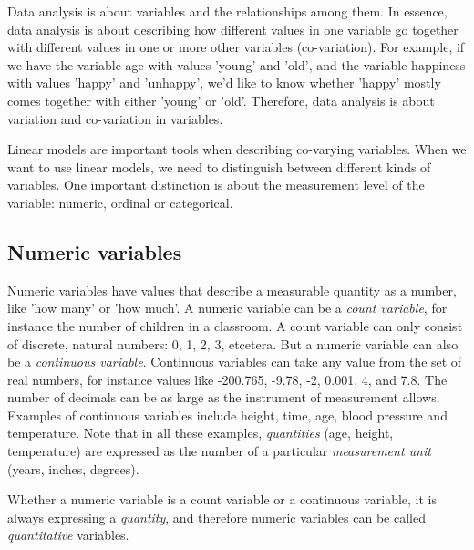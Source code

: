 \documentclass[]{book}\usepackage[]{graphicx}\usepackage[]{color}
\begin{document}
Data analysis is about variables and the relationships among them. In essence, data analysis is about describing how different values in one variable go together with different values in one or more other variables (co-variation). For example, if we have the variable age with values 'young' and 'old', and the variable happiness with values 'happy' and 'unhappy', we'd like to know whether 'happy' mostly comes together with either 'young' or 'old'. Therefore, data analysis is about variation and co-variation in variables.

Linear models are important tools when describing co-varying variables. When we want to use linear models, we need to distinguish between different kinds of variables. One important distinction is about the measurement level of the variable: numeric, ordinal or categorical.


\subsection{Numeric variables}

Numeric variables have values that describe a measurable quantity as a number, like 'how many' or 'how much'. A numeric variable can be a \textit{count variable}, for instance the number of children in a classroom. A count variable can only consist of discrete, natural numbers: 0, 1, 2, 3, etcetera. But a numeric variable can also be a \textit{continuous variable}. Continuous variables can take any value from the set of real numbers, for instance values like -200.765, -9.78, -2, 0.001, 4, and 7.8. The number of decimals can be as large as the instrument of measurement allows. Examples of continuous variables include height, time, age, blood pressure and temperature. Note that in all these examples, \textit{quantities} (age, height, temperature) are expressed as the number of a particular \textit{measurement unit} (years, inches, degrees).

Whether a numeric variable is a count variable or a continuous variable, it is always expressing a \textit{quantity}, and therefore numeric variables can be called \textit{quantitative} variables.



\end{document}

